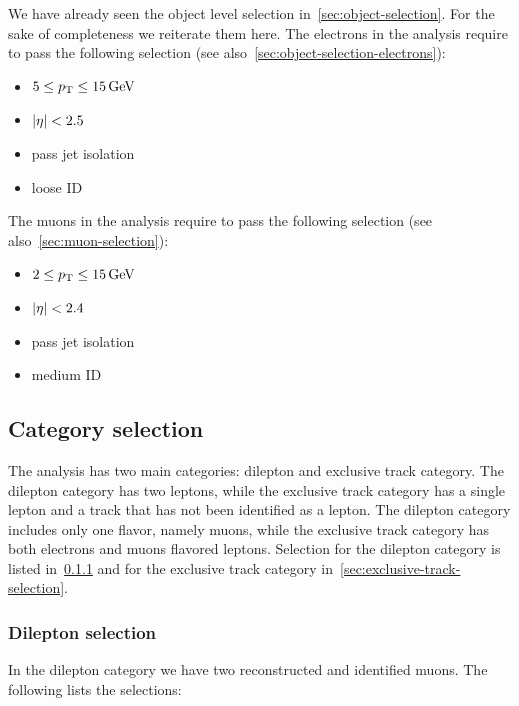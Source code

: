 We have already seen the object level selection in~\ref{sec:object-selection}. For the sake of completeness we reiterate them here. The electrons in the analysis require to pass the following selection (see also~\ref{sec:object-selection-electrons}):

\begin{itemize}

\item $5 \leq p_{\mathrm{T}} \leq 15\,\text{Ge\hspace{-.08em}V}$
\item $\lvert \eta \rvert < 2.5$
\item pass jet isolation
\item loose ID

\end{itemize}

The muons in the analysis require to pass the following selection (see also~\ref{sec:muon-selection}):

\begin{itemize}

\item $2 \leq p_{\mathrm{T}} \leq 15\,\text{Ge\hspace{-.08em}V}$
\item $\lvert \eta \rvert < 2.4$
\item pass jet isolation
\item medium ID

\end{itemize}

\subsection{Category selection}
\label{sec:category-selection}

The analysis has two main categories: dilepton and exclusive track category. The dilepton category has two leptons, while the exclusive track category has a single lepton and a track that has not been identified as a lepton. The dilepton category includes only one flavor, namely muons, while the exclusive track category has both electrons and muons flavored leptons. Selection for the dilepton category is listed in~\ref{sec:dilepton-selection} and for the exclusive track category in~\ref{sec:exclusive-track-selection}.

\subsubsection{Dilepton selection}
\label{sec:dilepton-selection}

In the dilepton category we have two reconstructed and identified muons. The following lists the selections:

